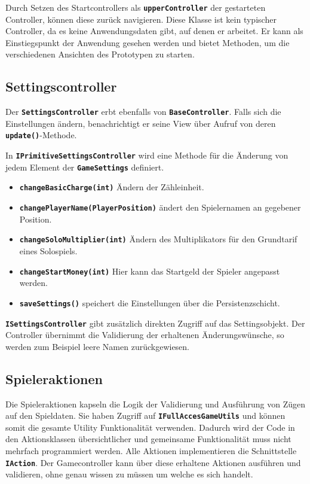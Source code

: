 \documentclass[
							a4paper, 
							11pt, 
							openany, 
							liststotoc,
							parskip=half, 
   							headings=normal
						]{scrreprt}
\begin{document}
{Durch Setzen des Startcontrollers als \textbf{\texttt{upperController}} der gestarteten Controller, kön\-nen diese zurück navigieren. Diese Klasse ist kein typischer Controller, da es keine Anwendungsdaten gibt, auf denen er arbeitet. Er kann als Einstiegspunkt der Anwendung gesehen werden und bietet Methoden, um die verschiedenen Ansichten des Prototypen zu starten.

\subsection{Settingscontroller} \label{sse:anwendung_controller_settings}
Der \textbf{\texttt{SettingsController}} erbt ebenfalls von \textbf{\texttt{BaseController}}. Falls sich die Einstellungen ändern, benachrichtigt er seine View über Aufruf von deren \textbf{\texttt{update()}}-Methode.

In \textbf{\texttt{IPri\-mi\-tive\-Set\-tings\-Con\-trol\-ler}} wird eine Methode für die Änderung von jedem Element der \textbf{\texttt{GameSettings}} definiert.
\begin{itemize}
	\item \textbf{\texttt{changeBasicCharge(int)}} Ändern der Zähleinheit.
	\item \textbf{\texttt{changePlayerName(PlayerPosition)}} ändert den Spielernamen an gegebener Position.
	\item \textbf{\texttt{changeSoloMultiplier(int)}} Ändern des Multiplikators für den Grundtarif eines Solospiels.
	\item \textbf{\texttt{changeStartMoney(int)}} Hier kann das Startgeld der Spieler angepasst werden.
		\item \textbf{\texttt{saveSettings()}} speichert die Einstellungen über die Persistenzschicht.
\end{itemize}\bigskip

\textbf{\texttt{ISettingsController}} gibt zusätzlich direkten Zugriff auf das Settingsobjekt. Der Controller übernimmt die Validierung der erhaltenen Änderungswünsche, so werden zum Beispiel leere Namen zurückgewiesen.

\clearpage

\subsection{Spieleraktionen} \label{sse:anwendung_controller_game_actions}
Die Spieleraktionen kapseln die Logik der Validierung und Ausführung von Zügen auf den Spieldaten. Sie haben Zugriff auf \textbf{\texttt{IFullAccesGameUtils}} und können somit die gesamte Utility Funktionalität verwenden. Dadurch wird der Code in den Aktionsklassen übersichtlicher und gemeinsame Funktionalität muss nicht mehrfach programmiert werden. Alle Aktionen implementieren die Schnittstelle \textbf{\texttt{IAction}}. Der Gamecontroller kann über diese erhaltene Aktionen ausführen und validieren, ohne genau wissen zu müssen um welche es sich handelt. 

}
\end{document}
